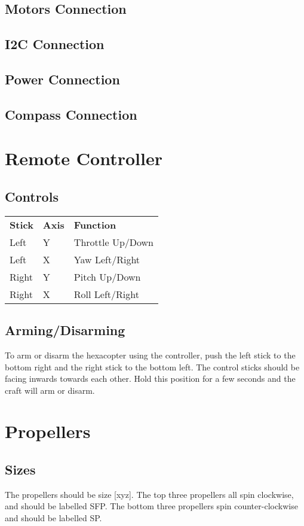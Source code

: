\documentclass{style}
\begin{document}
\subsection{Motors Connection}
\subsection{I2C Connection}
\subsection{Power Connection}
\subsection{Compass Connection}
\section{Remote Controller}
\subsection{Controls}
\begin{tabular}{ l l l }
  \textbf{Stick} & \textbf{Axis} & \textbf{Function} \\
  Left & Y & Throttle Up/Down \\
  Left & X & Yaw Left/Right \\
  Right & Y & Pitch Up/Down \\
  Right & X & Roll Left/Right
\end{tabular}
\subsection{Arming/Disarming}
To arm or disarm the hexacopter using the controller, push the left stick to the bottom right and the right stick to the bottom left.  The control sticks should be facing inwards towards each other.  Hold this position for a few seconds and the craft will arm or disarm.
\section{Propellers}
\subsection{Sizes}
The propellers should be size [xyz].  The top three propellers all spin clockwise, and should be labelled SFP.  The bottom three propellers spin counter-clockwise and should be labelled SP.
\end{document}

